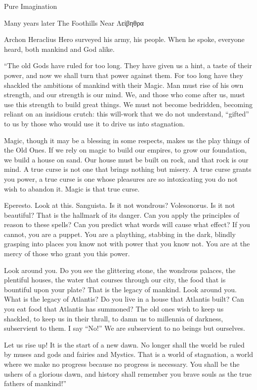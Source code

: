 {Pure Imagination}

Many years later
The Foothills Near Λείβηθρα

{A}{rchon} Heraclius Hero surveyed his army, his people. When he spoke, everyone heard, both mankind and God alike.

“The old Gods have ruled for too long. They have given us a hint, a taste of their power, and now we shall turn that power against them. For too long have they shackled the ambitions of mankind with their Magic. Man must rise of his own strength, and our strength is our mind. We, and those who come after us, must use this strength to build great things. We must not become bedridden, becoming reliant on an insidious crutch: this will-work that we do not understand, “gifted” to us by those who would use it to drive us into stagnation.

Magic, though it may be a blessing in some respects, makes us the play things of the Old Ones. If we rely on magic to build our empires, to grow our foundation, we build a house on sand. Our house must be built on rock, and that rock is our mind. A true curse is not one that brings nothing but misery. A true curse grants you power, a true curse is one whose pleasures are so intoxicating you do not wish to abandon it. Magic is that true curse.

Eperesto. Look at this. Sanguista. Is it not wondrous? Volesonorus. Is it not beautiful? That is the hallmark of its danger. Can you apply the principles of reason to these spells? Can you predict what words will cause what effect? If you cannot, you are a puppet. You are a plaything, stabbing in the dark, blindly grasping into places you know not with power that you know not. You are at the mercy of those who grant you this power.

Look around you. Do you see the glittering stone, the wondrous palaces, the plentiful houses, the water that courses through our city, the food that is bountiful upon your plate? That is the legacy of mankind. Look around you. What is the legacy of Atlantis? Do you live in a house that Atlantis built? Can you eat food that Atlantis has summoned? The old ones wish to keep us shackled, to keep us in their thrall, to damn us to millennia of darkness, subservient to them. I say “No!” We are subservient to no beings but ourselves.

Let us rise up! It is the start of a new dawn. No longer shall the world be ruled by muses and gods and fairies and Mystics. That is a world of stagnation, a world where we make no progress because no progress is necessary. You shall be the ushers of a glorious dawn, and history shall remember you brave souls as the true fathers of mankind!”


